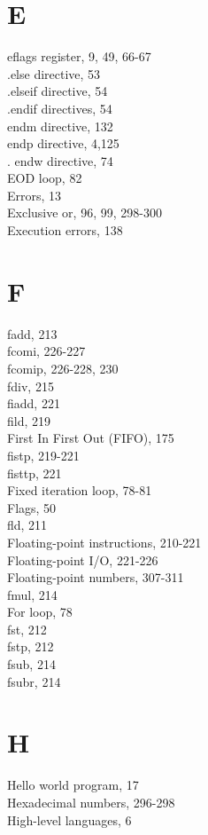 \documentclass[10pt]{article}
\begin{document}
\section*{E}
eflags register, 9, 49, 66-67\\
.else directive, 53\\
.elseif directive, 54\\
.endif directives, 54\\
endm directive, 132\\
endp directive, 4,125\\
. endw directive, 74\\
EOD loop, 82\\
Errors, 13\\
Exclusive or, 96, 99, 298-300\\
Execution errors, 138

\section*{F}
fadd, 213\\
fcomi, 226-227\\
fcomip, 226-228, 230\\
fdiv, 215\\
fiadd, 221\\
fild, 219\\
First In First Out (FIFO), 175\\
fistp, 219-221\\
fisttp, 221\\
Fixed iteration loop, 78-81\\
Flags, 50\\
fld, 211\\
Floating-point instructions, 210-221\\
Floating-point I/O, 221-226\\
Floating-point numbers, 307-311\\
fmul, 214\\
For loop, 78\\
fst, 212\\
fstp, 212\\
fsub, 214\\
fsubr, 214

\section*{H}
Hello world program, 17\\
Hexadecimal numbers, 296-298\\
High-level languages, 6
\end{document}

